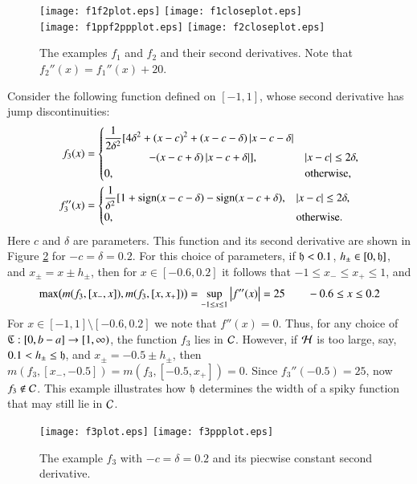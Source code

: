 \documentclass[review]{elsarticle}
\begin{document}
\begin{figure}[t]
\centering
\texttt{[image: f1f2plot.eps]} \qquad
\texttt{[image: f1closeplot.eps]} \\
\texttt{[image: f1ppf2ppplot.eps]} \qquad
\texttt{[image: f2closeplot.eps]}
\caption{The examples $f_1$ and $f_2$ and their second derivatives.  Note that $f_2''(x) = f_1''(x) + 20$. \label{f1f2fig}}
\end{figure}

Consider the following function defined on $[-1,1]$, whose second derivative has jump discontinuities:
\begin{align*}
f_3(x) & = \begin{cases} \displaystyle \frac{1}{2\delta^2} [4 \delta^2 + (x-c)^2 + (x-c-\delta)\left \lvert x-c-\delta \right \rvert \\
\qquad \qquad - (x-c+\delta)\left \lvert x-c+\delta \right \rvert], & \left \lvert x-c \right \rvert \le 2\delta, \\
0, & \text{otherwise},
\end{cases} \\
f''_3(x) & = \begin{cases} \displaystyle \frac{1}{\delta^2} [1 + \operatorname{sign}(x-c-\delta) - \operatorname{sign}(x-c+\delta), & \left \lvert x-c \right \rvert \le 2\delta, \\
0, & \text{otherwise}.
\end{cases}
\end{align*}
Here $c$ and $\delta$ are parameters.  This function and its second derivative are shown in Figure \ref{f3fig} for $-c=\delta = 0.2$.  For this choice of parameters, if $\mathfrak{h} < 0.1$,  $h_\pm \in [0,\mathfrak{h}]$, and $x_\pm = x\pm h_\pm$, then for $x \in [-0.6, 0.2]$ it follows that $-1 \le x_- \le x_+ \le 1$, and 
\[
\max\bigl(m(f_3,[x_-,x]),m(f_3,[x,x_+])\bigr) = \sup_{-1 \le x \le 1} \left \lvert f''(x) \right \rvert = 25 \qquad -0.6 \le x \le 0.2
\]
For $x \in [-1,1] \setminus [-0.6, 0.2]$ we note that $f''(x) = 0$.  Thus, for any choice of $\mathfrak{C} : [0,b-a] \to [1,\infty)$, the function $f_3$ lies in $\mathcal{C}$.  However, if $\mathcal{H}$ is too large, say, $0.1 < h_\pm \le \mathfrak{h}$, and  $x_\pm = -0.5\pm h_\pm$, then $m(f_3,[x_-,-0.5])=m(f_3,[-0.5,x_+])=0$.  Since $f_3''(-0.5) = 25$, now $f_3 \notin \mathcal{C}$.  This example illustrates how $\mathfrak{h}$ determines the width of a spiky function that may still lie in $\mathcal{C}$.

\begin{figure}[t]
\centering
\texttt{[image: f3plot.eps]} \qquad
\texttt{[image: f3ppplot.eps]} 
\caption{The example $f_3$ with $-c=\delta = 0.2$  and its piecwise constant second derivative.  \label{f3fig}}
\end{figure}
\end{document}

